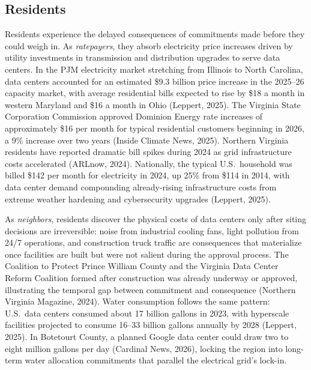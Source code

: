 \documentclass[10pt, twocolumn]{article}
\begin{document}
\subsection*{Residents}

Residents experience the delayed consequences of commitments made before they could weigh in. As \textit{ratepayers}, they absorb electricity price increases driven by utility investments in transmission and distribution upgrades to serve data centers. In the PJM electricity market stretching from Illinois to North Carolina, data centers accounted for an estimated \$9.3 billion price increase in the 2025--26 capacity market, with average residential bills expected to rise by \$18 a month in western Maryland and \$16 a month in Ohio (Leppert, 2025). The Virginia State Corporation Commission approved Dominion Energy rate increases of approximately \$16 per month for typical residential customers beginning in 2026, a 9\% increase over two years (Inside Climate News, 2025). Northern Virginia residents have reported dramatic bill spikes during 2024 as grid infrastructure costs accelerated (ARLnow, 2024). Nationally, the typical U.S.\ household was billed \$142 per month for electricity in 2024, up 25\% from \$114 in 2014, with data center demand compounding already-rising infrastructure costs from extreme weather hardening and cybersecurity upgrades (Leppert, 2025).

As \textit{neighbors}, residents discover the physical costs of data centers only after siting decisions are irreversible: noise from industrial cooling fans, light pollution from 24/7 operations, and construction truck traffic are consequences that materialize once facilities are built but were not salient during the approval process. The Coalition to Protect Prince William County and the Virginia Data Center Reform Coalition formed after construction was already underway or approved, illustrating the temporal gap between commitment and consequence (Northern Virginia Magazine, 2024). Water consumption follows the same pattern: U.S.\ data centers consumed about 17 billion gallons in 2023, with hyperscale facilities projected to consume 16--33 billion gallons annually by 2028 (Leppert, 2025). In Botetourt County, a planned Google data center could draw two to eight million gallons per day (Cardinal News, 2026), locking the region into long-term water allocation commitments that parallel the electrical grid's lock-in.
\end{document}
